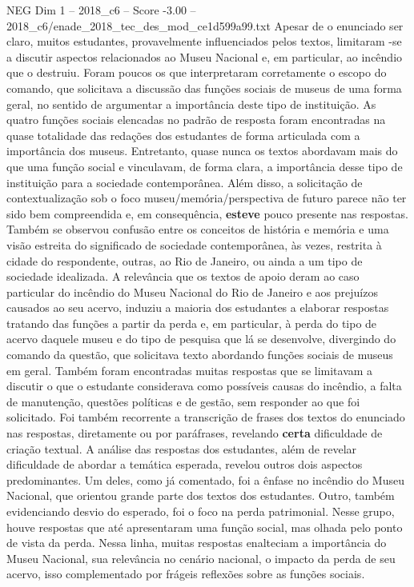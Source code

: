 \begin{textsample}{NEG Dim 1 – 2018\_c6 – Score -3.00 – 2018\_c6/enade\_2018\_tec\_des\_mod\_ce1d599a99.txt}
Apesar de o enunciado ser claro, muitos estudantes, provavelmente influenciados pelos textos, limitaram -se a discutir aspectos relacionados ao Museu Nacional e, em particular, ao incêndio que o destruiu.
Foram poucos os que interpretaram corretamente o escopo do comando, que solicitava a discussão das funções sociais de museus de uma forma geral, no sentido de argumentar a importância deste tipo de instituição.
As quatro funções sociais elencadas no padrão de resposta foram encontradas na quase totalidade das redações dos estudantes de forma articulada com a importância dos museus.
Entretanto, quase nunca os textos abordavam mais do que uma função social e vinculavam, de forma clara, a importância desse tipo de instituição para a sociedade contemporânea.
Além disso, a solicitação de contextualização sob o foco museu/memória/perspectiva de futuro parece não ter sido bem compreendida e, em consequência, \textbf{esteve} pouco presente nas respostas.
Também se observou confusão entre os conceitos de história e memória e uma visão estreita do significado de sociedade contemporânea, às vezes, restrita à cidade do respondente, outras, ao Rio de Janeiro, ou ainda a um tipo de sociedade idealizada.
A relevância que os textos de apoio deram ao caso particular do incêndio do Museu Nacional do Rio de Janeiro e aos prejuízos causados ao seu acervo, induziu a maioria dos estudantes a elaborar respostas tratando das funções a partir da perda e, em particular, à perda do tipo de acervo daquele museu e do tipo de pesquisa que lá se desenvolve, divergindo do comando da questão, que solicitava texto abordando funções sociais de museus em geral.
Também foram encontradas muitas respostas que se limitavam a discutir o que o estudante considerava como possíveis causas do incêndio, a falta de manutenção, questões políticas e de gestão, sem responder ao que foi solicitado.
Foi também recorrente a transcrição de frases dos textos do enunciado nas respostas, diretamente ou por paráfrases, revelando \textbf{certa} dificuldade de criação textual.
A análise das respostas dos estudantes, além de revelar dificuldade de abordar a temática esperada, revelou outros dois aspectos predominantes.
Um deles, como já comentado, foi a ênfase no incêndio do Museu Nacional, que orientou grande parte dos textos dos estudantes.
Outro, também evidenciando desvio do esperado, foi o foco na perda patrimonial.
Nesse grupo, houve respostas que até apresentaram uma função social, mas olhada pelo ponto de vista da perda.
Nessa linha, muitas respostas enalteciam a importância do Museu Nacional, sua relevância no cenário nacional, o impacto da perda de seu acervo, isso complementado por frágeis reflexões sobre as funções sociais.

\end{textsample}
